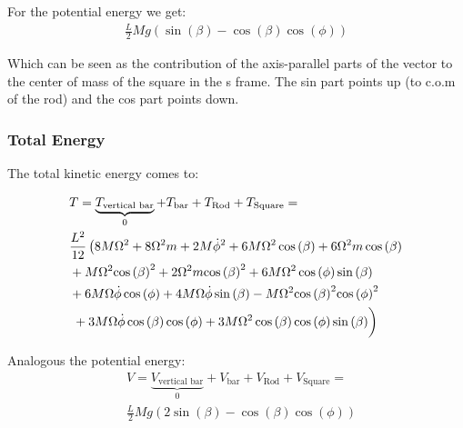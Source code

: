 For the potential energy we get:
\begin{equation}
    \begin{split}
        \frac{L}{2}Mg\left(\sin\left(\beta \right)-\cos\left(\beta \right)\cos\left(\phi \right)\right)
    \end{split}
\end{equation}

Which can be seen as the contribution of the axis-parallel parts of the vector to the center of mass of the square in the s frame. The sin part points up (to c.o.m of the rod) and the cos part points down.

\subsubsection{Total Energy}
The total kinetic energy comes to:

\begin{equation}
    \begin{split}
        &T = \underbrace{T_\text{vertical bar}}_{0} + T_\text{bar} + T_\text{Rod} + T_\text{Square} = \\
        &\frac{L^2}{12}\left(8M\Omega ^2+8\Omega ^2m+2M{\mathrm{\dot\phi}}^2+6M\Omega ^2\cos\left(\beta \right)+6\Omega ^2m\cos\left(\beta \right)\right.\\
        &+M\Omega ^2{\cos\left(\beta \right)}^2+2\Omega ^2m{\cos\left(\beta \right)}^2+6M\Omega ^2\cos\left(\phi \right)\sin\left(\beta \right)\\
        &+6M\Omega \mathrm{\dot\phi}\cos\left(\phi \right)+4M\Omega \mathrm{\dot\phi}\sin\left(\beta \right)-M\Omega ^2{\cos\left(\beta \right)}^2{\cos\left(\phi \right)}^2\\
        &\left.\vphantom{\int}+3M\Omega \mathrm{\dot\phi}\cos\left(\beta \right)\cos\left(\phi \right)+3M\Omega ^2\cos\left(\beta \right)\cos\left(\phi \right)\sin\left(\beta \right)\right)
    \end{split}
\end{equation}

Analogous the potential energy:
\begin{equation}
    \begin{split}
        &V = \underbrace{V_\text{vertical bar}}_{0} + V_\text{bar} + V_\text{Rod} + V_\text{Square} = \\
        & \frac{L}{2}Mg\left(2\sin\left(\beta \right)-\cos\left(\beta \right)\cos\left(\phi \right)\right)
    \end{split}
\end{equation}

